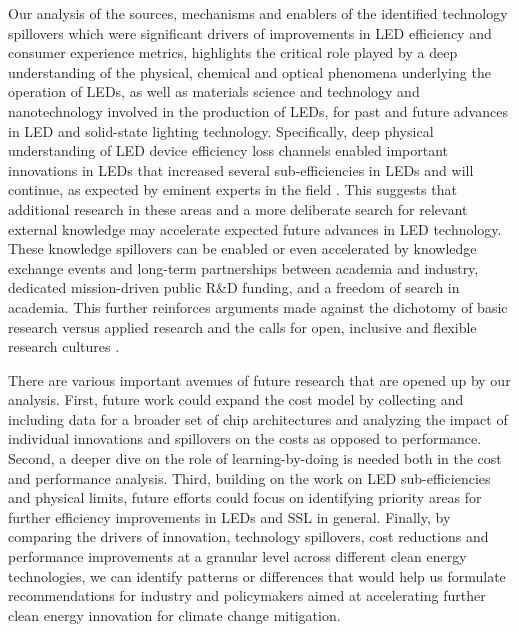 \documentclass[journal=jacsat,manuscript=article]{achemso}
\begin{document}
Our analysis of the sources, mechanisms and enablers of the identified technology spillovers which were significant drivers of improvements in LED efficiency and consumer experience metrics, highlights the critical role played by a deep understanding of the physical, chemical and optical phenomena underlying the operation of LEDs, as well as materials science and technology and nanotechnology involved in the production of LEDs, for past and future advances in LED and solid-state lighting technology. Specifically, deep physical understanding of LED device efficiency loss channels enabled important innovations in LEDs that increased several sub-efficiencies in LEDs and will continue, as expected by eminent experts in the field \cite{Weisbuch2020}. This suggests that additional research in these areas and a more deliberate search for relevant external knowledge may accelerate expected future advances in LED technology. These knowledge spillovers can be enabled or even accelerated by knowledge exchange events and long-term partnerships between academia and industry, dedicated mission-driven public R\&D funding, and a freedom of search in academia. This further reinforces arguments made against the dichotomy of basic research versus applied research \cite{narayanamurti2016cycles}\cite{narayanamurti2021genesis} and the calls for open, inclusive and flexible research cultures \cite{Stephan2021}.

There are various important avenues of future research that are opened up by our analysis. First, future work could expand the cost model by collecting and including data for a broader set of chip architectures and analyzing the impact of individual innovations and spillovers on the costs as opposed to performance. Second, a deeper dive on the role of learning-by-doing is needed both in the cost and performance analysis. Third, building on the work on LED sub-efficiencies and physical limits, future efforts could focus on identifying priority areas for further efficiency improvements in LEDs and SSL in general. Finally, by comparing the drivers of innovation, technology spillovers, cost reductions and performance improvements at a granular level across different clean energy technologies, we can identify patterns or differences that would help us formulate recommendations for industry and policymakers aimed at accelerating further clean energy innovation for climate change mitigation. 
\end{document}
